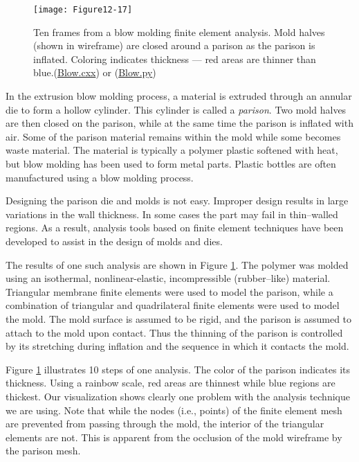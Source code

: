 \begin{figure}[!htb]
	\centering
	\texttt{[image: Figure12-17]}
	\caption{Ten frames from a blow molding finite element analysis. Mold halves (shown in wireframe) are closed around a parison as the parison is inflated. Coloring indicates thickness --- red areas are thinner than blue.(\href{https://lorensen.github.io/VTKExamples/site/Cxx/Visualization/Blow/}{Blow.cxx}) or (\href{https://lorensen.github.io/VTKExamples/site/Python/Visualization/Blow/}{Blow.py})}
	\label{fig:Figure12-17}
\end{figure}

In the extrusion blow molding process, a material is extruded through an annular die to form a hollow cylinder. This cylinder is called a \emph{parison}. Two mold halves are then closed on the parison, while at the same time the parison is inflated with air. Some of the parison material remains within the mold while some becomes waste material. The material is typically a polymer plastic softened with heat, but blow molding has been used to form metal parts. Plastic bottles are often manufactured using a blow molding process.

Designing the parison die and molds is not easy. Improper design results in large variations in the wall thickness. In some cases the part may fail in thin--walled regions. As a result, analysis tools based on finite element techniques have been developed to assist in the design of molds and dies.

The results of one such analysis are shown in Figure \ref{fig:Figure12-17}. The polymer was molded using an isothermal, nonlinear-elastic, incompressible (rubber--like) material. Triangular membrane finite elements were used to model the parison, while a combination of triangular and quadrilateral finite elements were used to model the mold. The mold surface is assumed to be rigid, and the parison is assumed to attach to the mold upon contact. Thus the thinning of the parison is controlled by its stretching during inflation and the sequence in which it contacts the mold.

Figure \ref{fig:Figure12-17} illustrates 10 steps of one analysis. The color of the parison indicates its thickness. Using a rainbow scale, red areas are thinnest while blue regions are thickest. Our visualization shows
clearly one problem with the analysis technique we are using. Note that while the nodes (i.e., points) of the finite element mesh are prevented from passing through the mold, the interior of the triangular elements are not. This is apparent from the occlusion of the mold wireframe by the parison mesh.

